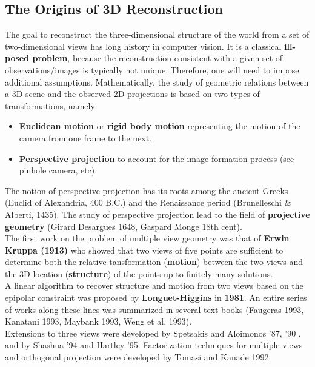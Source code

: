 \subsection{The Origins of 3D Reconstruction}%
\label{sub:the_origins_of_3d_reconstruction}

The goal to reconstruct the three-dimensional structure of the world from
a set of two-dimensional views has long history in computer vision.
It is a classical \textbf{ill-posed problem}, because the reconstruction
consistent with a given set of observations/images is typically not unique.
Therefore, one will need to impose additional assumptions.
Mathematically, the study of geometric relations between a 3D scene
and the observed 2D projections is based on two types of transformations, namely:
\begin{itemize}
	\item \textbf{Euclidean motion} or \textbf{rigid body motion}
		representing the motion of the camera from one frame to the next.
	\item \textbf{Perspective projection} to account for the image formation
		process (see pinhole camera, etc).
\end{itemize}

The notion of perspective projection has its roots among the ancient Greeks
(Euclid of Alexandria, \roughly{} 400 B.C.) and the Renaissance period
(Brunelleschi \& Alberti, 1435).
The study of perspective projection lead to the field of
\textbf{projective geometry} (Girard Desargues 1648, Gaspard Monge 18th cent).\\

The first work on the problem of multiple view geometry was that of
\textbf{Erwin Kruppa (1913)} who showed that two views of five points
are sufficient to determine both the relative tansformation
(\textbf{motion}) between the two views and the 3D location (\textbf{structure})
of the points up to finitely many solutions.\\

A linear algorithm to recover structure and motion from two views based
on the epipolar constraint was proposed by \textbf{Longuet-Higgins}
in \textbf{1981}. An entire series of works along these lines was summarized
in several text books (Faugeras 1993, Kanatani 1993,
Maybank 1993, Weng et al. 1993).\\

Extensions to three views were developed by Spetsakis and Aloimonos '87, '90
, and by Shashua '94 and Hartley '95.
Factorization techniques for multiple views and orthogonal projection were
developed by Tomasi and Kanade 1992.\\

